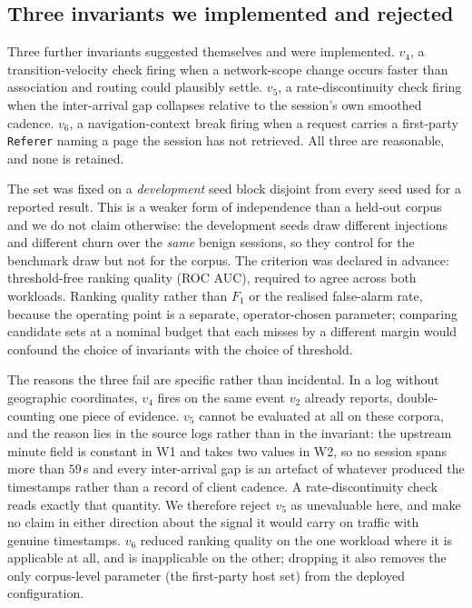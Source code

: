 \documentclass[conference]{IEEEtran}
\begin{document}
\subsection{Three invariants we implemented and rejected}
\label{sec:rejected}

Three further invariants suggested themselves and were implemented.  $v_4$, a
transition-velocity check firing when a network-scope change occurs faster than
association and routing could plausibly settle.  $v_5$, a rate-discontinuity
check firing when the inter-arrival gap collapses relative to the session's own
smoothed cadence.  $v_6$, a navigation-context break firing when a request
carries a first-party \texttt{Referer} naming a page the session has not
retrieved.  All three are reasonable, and none is retained.

The set was fixed on a \emph{development} seed block disjoint from every seed
used for a reported result.  This is a weaker form of independence than a
held-out corpus and we do not claim otherwise: the development seeds draw
different injections and different churn over the \emph{same} benign sessions,
so they control for the benchmark draw but not for the corpus.  The criterion was
declared in advance:
threshold-free ranking quality (ROC AUC), required to agree across both
workloads.  Ranking quality rather than $F_1$ or the realised false-alarm rate,
because the operating point is a separate, operator-chosen parameter; comparing
candidate sets at a nominal budget that each misses by a different margin would
confound the choice of invariants with the choice of threshold.

The reasons the three fail are specific rather than incidental.  In a log
without geographic coordinates, $v_4$ fires on the same event $v_2$ already
reports, double-counting one piece of evidence.  $v_5$ cannot be evaluated at
all on these corpora, and the reason lies in the source logs rather than in the
invariant: the upstream minute field is constant in W1 and takes two values in
W2, so no session spans more than $59$\,s and every inter-arrival gap is an
artefact of whatever produced the timestamps rather than a record of client
cadence.  A rate-discontinuity check reads exactly that quantity.  We therefore
reject $v_5$ as unevaluable here, and make no claim in either direction about the
signal it would carry on traffic with genuine timestamps.  $v_6$ reduced ranking quality on the one workload
where it is applicable at all, and is inapplicable on the other; dropping it
also removes the only corpus-level parameter (the first-party host set) from the
deployed configuration.
\end{document}

